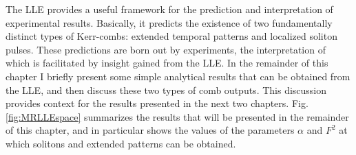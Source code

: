 

The LLE provides a useful framework for the prediction and interpretation of experimental results. Basically, it predicts the existence of two fundamentally distinct types of Kerr-combs: extended temporal patterns and localized soliton pulses. These predictions are born out by experiments, the interpretation of which is facilitated by insight gained from the LLE. In the remainder of this chapter I briefly present some simple analytical results that can be obtained from the LLE, and then discuss these two types of comb outputs. This discussion provides context for the results presented in the next two chapters. Fig. \ref{fig:MRLLEspace} summarizes the results that will be presented in the remainder of this chapter, and in particular shows the values of the parameters $\alpha$ and $F^2$ at which solitons and extended patterns can be obtained.

